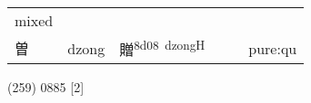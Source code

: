 \documentclass[14pt,a4paper]{scrartcl}
\begin{document}
\begin{longtable}[c]{@{}llllll@{}}
\begin{minipage}[t]{0.14\columnwidth}\raggedright\strut
mixed
\strut\end{minipage}\tabularnewline
\begin{minipage}[t]{0.14\columnwidth}\raggedright\strut
曽
\strut\end{minipage} &
\begin{minipage}[t]{0.14\columnwidth}\raggedright\strut
dzong
\strut\end{minipage} &
\begin{minipage}[t]{0.14\columnwidth}\raggedright\strut
贈\textsuperscript{8d08~dzongH}
\strut\end{minipage} &
\begin{minipage}[t]{0.14\columnwidth}\raggedright\strut
\strut\end{minipage} &
\begin{minipage}[t]{0.14\columnwidth}\raggedright\strut
\strut\end{minipage} &
\begin{minipage}[t]{0.14\columnwidth}\raggedright\strut
pure:qu
\strut\end{minipage}\tabularnewline
\bottomrule
\end{longtable}

(259) 0885 {[}2{]}
\end{document}
